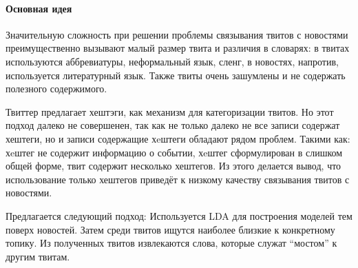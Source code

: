         \paragraph{Основная идея}
            Значительную сложность при решении проблемы связывания твитов с новостями преимущественно вызывают малый размер твита и различия в словарях: в твитах используются аббревиатуры, неформальный язык, сленг, в новостях, напротив, используется литературный язык. Также твиты очень зашумлены и не содержать полезного содержимого.

            Твиттер предлагает хештэги, как механизм для категоризации твитов. Но этот подход далеко не совершенен, так как не только далеко не все записи содержат хештеги, но и записи содержащие хeштеги обладают рядом проблем. Такими как: хeштег не содержит информацию о событии, хeштег сформулирован в слишком общей форме, твит содержит несколько хештегов. Из этого делается вывод, что использование только хештегов приведёт к низкому качеству связывания твитов с новостями.

            Предлагается следующий подход:
            Используется LDA для построения моделей тем поверх новостей. Затем среди твитов ищутся наиболее близкие к конкретному топику. Из полученных твитов извлекаются слова, которые служат ``мостом'' к другим твитам.

